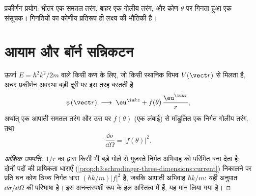 \begin{omfigure}

{\small प्रकीर्णन प्रयोग: भीतर एक समतल तरंग, बाहर एक गोलीय
तरंग, और कोण $\theta$ पर गिनता हुआ एक संसूचक। गिनतियों का कोणीय
प्रतिरूप ही लक्ष्य की भौतिकी है।}
\end{omfigure}

\section{आयाम और बॉर्न सन्निकटन}

\begin{theorem}[प्रकीर्णन अवस्थाएँ और आयाम]\label{thm:b3:scattering-theory:amplitude}
ऊर्जा $E = \hbar^2k^2/2m$ वाले किसी कण के लिए, जो किसी स्थानिक
विभव $V(\vect r)$ से मिलता है, अचर प्रकीर्णन अवस्था बड़ी दूरी पर
इस तरह बरतती है
\[
\psi(\vect r) \;\longrightarrow\;
\eu^{\iu kz} + f(\theta)\,\frac{\eu^{\iu kr}}{r} ,
\]
अर्थात् एक आपाती समतल तरंग और उस पर \emph{}
$f(\theta)$ (एक लंबाई) से मॉडुलित एक निर्गत गोलीय तरंग, तथा
\[
\frac{\dd\sigma}{\dd\Omega} = |f(\theta)|^2 .
\]
\end{theorem}

\begin{proof}[आंशिक उपपत्ति]
$1/r$ का ह्रास किसी भी बड़े गोले से गुज़रते निर्गत अभिवाह को परिमित
बना देता है; दोनों पदों की प्रायिकता धाराएँ
(\cref{prop:b3:schrodinger-three-dimensions:current}) निकालने पर
प्रति घन कोण त्रिज्य निर्गत धारा
$(\hbar k/m)|f|^2$ है, जबकि आपाती अभिवाह $\hbar k/m$: यही अनुपात
$\dd\sigma/\dd\Omega$ की परिभाषा है। इस अनन्तस्पर्शी रूप के हल
अस्तित्व में हैं, यह मान लिया गया है।
\end{proof}

